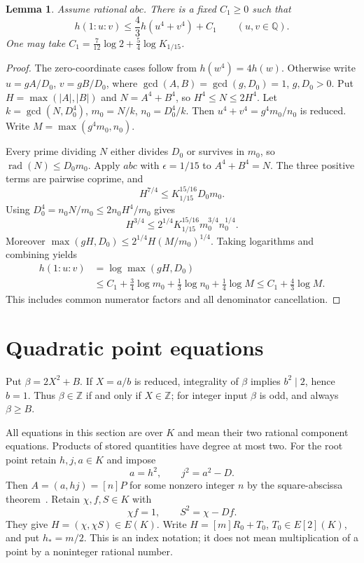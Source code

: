 \documentclass[11pt,a4paper]{article}
\newtheorem{lemma}[theorem]{Lemma}
\newcommand{\Q}{\mathbb Q}\newcommand{\Z}{\mathbb Z}
\DeclareMathOperator{\rad}{rad}
\begin{document}
\begin{lemma}\label{lem:pair}
Assume rational $abc$. There is a fixed $C_1\ge0$ such that
\[
                    h(1:u:v)\le\frac43h(u^4+v^4)+C_1
                    \qquad(u,v\in\Q).
\]
One may take $C_1=\frac7{12}\log2+\frac54\log K_{1/15}$.
\end{lemma}
\begin{proof}
The zero-coordinate cases follow from $h(w^4)=4h(w)$.
Otherwise write $u=gA/D_0$, $v=gB/D_0$, where
$\gcd(A,B)=\gcd(g,D_0)=1$, $g,D_0>0$. Put
$H=\max(|A|,|B|)$ and $N=A^4+B^4$, so $H^4\le N\le2H^4$.
Let $k=\gcd(N,D_0^4)$, $m_0=N/k$, $n_0=D_0^4/k$.
Then $u^4+v^4=g^4m_0/n_0$ is reduced. Write
$M=\max(g^4m_0,n_0)$.

Every prime dividing $N$ either divides $D_0$ or survives in $m_0$,
so $\rad(N)\le D_0m_0$. Apply $abc$ with $\epsilon=1/15$ to
$A^4+B^4=N$. The three positive terms are pairwise coprime, and
\[
 H^{7/4}\le K_{1/15}^{15/16}D_0m_0.
\]
Using $D_0^4=n_0N/m_0\le2n_0H^4/m_0$ gives
\[
 H^{3/4}\le2^{1/4}K_{1/15}^{15/16}m_0^{3/4}n_0^{1/4}.
\]
Moreover $\max(gH,D_0)\le2^{1/4}H(M/m_0)^{1/4}$.
Taking logarithms and combining yields
\[
 \begin{split}
 h(1:u:v)&=\log\max(gH,D_0)\\
 &\le C_1+\frac34\log m_0+\frac13\log n_0+\frac14\log M
 \le C_1+\frac43\log M.
 \end{split}
\]
This includes common numerator factors and all denominator cancellation.
\end{proof}

\section{Quadratic point equations}

Put $\beta=2X^2+B$. If $X=a/b$ is reduced, integrality of $\beta$
implies $b^2\mid2$, hence $b=1$. Thus $\beta\in\Z$ if and only if
$X\in\Z$; for integer input $\beta$ is odd, and always $\beta\ge B$.

All equations in this section are over $K$ and mean their two rational
component equations. Products of stored quantities have degree at most two.
For the root point retain $h,j,a\in K$ and impose
\begin{equation}\label{eq:root}
                       a=h^2,\qquad j^2=a^2-D.
\end{equation}
Then $A=(a,hj)=[n]P$ for some nonzero integer $n$ by the
square-abscissa theorem~\cite{Squares}. Retain $\chi,f,S\in K$ with
\begin{equation}\label{eq:H}
                    \chi f=1,\qquad S^2=\chi-Df.
\end{equation}
They give $H=(\chi,\chi S)\in E(K)$. Write
$H=[m]R_0+T_0$, $T_0\in E[2](K)$, and put $h_*=m/2$.
This is an index notation; it does not mean multiplication of a point
by a noninteger rational number.
\end{document}
